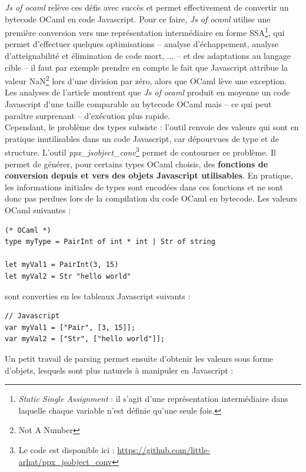 \textit{Js of ocaml} relève ces défis avec succès et permet effectivement de convertir un bytecode OCaml en code Javascript. Pour ce faire, \textit{Js of ocaml} utilise une première conversion vers une représentation intermédiaire en forme SSA\footnote{\textit{Static Single Assignment} : il s'agit d'une représentation intermédiaire dans laquelle chaque variable n'est définie qu'une seule fois.}, qui permet d'effectuer quelques optimisations -- analyse d'échappement, analyse d'atteignabilité et élimination de code mort, ... -- et des adaptations au langage cible -- il faut par exemple prendre en compte le fait que Javascript attribue la valeur NaN\footnote{Not A Number} lors d'une division par zéro, alors que OCaml lève une exception. Les analyses de l'article \cite{vouillon2014bytecode} montrent que \textit{Js of ocaml} produit en moyenne un code Javascript d'une taille comparable au bytecode OCaml mais -- ce qui peut paraître surprenant -- d'exécution plus rapide.\\

Cependant, le problème des types subsiste : l'outil renvoie des valeurs qui sont en pratique inutilisables dans un code Javascript, car dépourvues de type et de structure. L'outil \textit{ppx\_jsobject\_conv}\footnote{Le code est disponible ici : \url{https://github.com/little-arhat/ppx_jsobject_conv}} permet de contourner ce problème. Il permet de générer, pour certains types OCaml choisis, des \textbf{fonctions de conversion depuis et vers des objets Javascript utilisables}. En pratique, les informations initiales de types sont encodées dans ces fonctions et ne sont donc pas perdues lors de la compilation du code OCaml en bytecode. Les valeurs OCaml suivantes :

\begin{verbatim}
(* OCaml *)
type myType = PairInt of int * int | Str of string

let myVal1 = PairInt(3, 15)
let myVal2 = Str "hello world"
\end{verbatim}

sont converties en les tableaux Javascript suivants :

\begin{verbatim}
// Javascript
var myVal1 = ["Pair", [3, 15]];
var myVal2 = ["Str", ["hello world"]];
\end{verbatim}

Un petit travail de parsing permet ensuite d'obtenir les valeurs sous forme d'objets, lesquels sont plus naturels à manipuler en Javascript :

